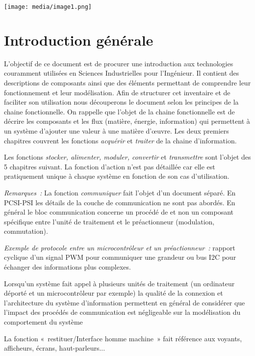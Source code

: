 \documentclass[
]{article}
\author{}
\date{}
\begin{document}
\texttt{[image: media/image1.png]}

\hypertarget{introduction-guxe9nuxe9rale}{%
\section{Introduction générale}\label{introduction-guxe9nuxe9rale}}

L'objectif de ce document est de procurer une introduction aux
technologies couramment utilisées en Sciences Industrielles pour
l'Ingénieur. Il contient des descriptions de composants ainsi que des
éléments permettant de comprendre leur fonctionnement et leur
modélisation. Afin de structurer cet inventaire et de faciliter son
utilisation nous découperons le document selon les principes de la
chaine fonctionnelle. On rappelle que l'objet de la chaine fonctionnelle
est de décrire les composants et les flux (matière, énergie,
information) qui permettent à un système d'ajouter une valeur à une
matière d'œuvre. Les deux premiers chapitres couvrent les fonctions
\emph{acquérir} et \emph{traiter} de la chaine d'information.

Les fonctions \emph{stocker, alimenter, moduler, convertir} et
\emph{transmettre} sont l'objet des 5 chapitres suivant. La fonction
d'action n'est pas détaillée car elle est pratiquement unique à chaque
système en fonction de son cas d'utilisation.

\emph{Remarques~:} La fonction \emph{communiquer} fait l'objet d'un
document séparé. En PCSI-PSI les détails de la couche de communication
ne sont pas abordés. En général le bloc communication concerne un
procédé de et non un composant spécifique entre l'unité de traitement et
le préactionneur (modulation, commutation).

\emph{Exemple de protocole entre un microcontrôleur et un
préactionneur~:} rapport cyclique d'un signal PWM pour communiquer une
grandeur ou bus I2C pour échanger des informations plus complexes.

Lorsqu'un système fait appel à plusieurs unités de traitement (un
ordinateur déporté et un microcontrôleur par exemple) la qualité de la
connexion et l'architecture du système d'information permettent en
général de considérer que l'impact des procédés de communication est
négligeable sur la modélisation du comportement du système

La fonction «~restituer/Interface homme machine~» fait référence aux
voyants, afficheurs, écrans, haut-parleurs...
\end{document}
